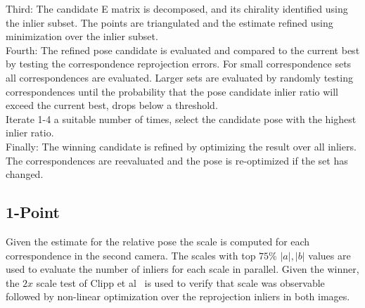 Third: The candidate E matrix is decomposed, and its chirality identified using the inlier subset. The points are triangulated and the estimate refined using minimization over the inlier subset. \\

Fourth: The refined pose candidate is evaluated and compared to the current best by testing the correspondence reprojection errors. For small correspondence sets all correspondences are evaluated. Larger sets are evaluated by randomly testing correspondences until the probability that the pose candidate inlier ratio will exceed the current best, drops below a threshold.\\

Iterate 1-4 a suitable number of times, select the candidate pose with the highest inlier ratio. \\

Finally: The winning candidate is refined by optimizing the result over all inliers. The correspondences are reevaluated and the pose is re-optimized if the set has changed. 

\subsection{1-Point}

Given the estimate for the relative pose the scale is computed for each correspondence in the second camera. The scales with top $75\%$ $|a|,|b|$ values are used to evaluate the number of inliers for each scale in parallel. Given the winner, the $2x$ scale test of Clipp et al~\cite{clipp2008robust} is used to verify that scale was observable followed by non-linear optimization over the reprojection inliers in both images. 






